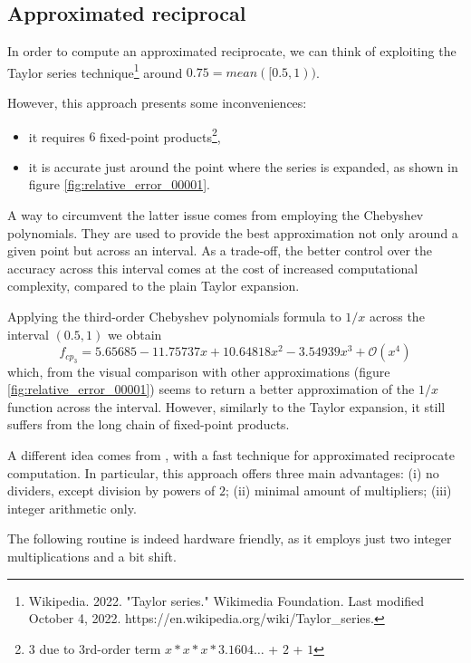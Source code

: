 \subsection{Approximated reciprocal}

In order to compute an approximated reciprocate, we can think of exploiting the Taylor series technique\footnote{Wikipedia. 2022. "Taylor series." Wikimedia Foundation. Last modified October 4, 2022. https://en.wikipedia.org/wiki/Taylor\_series.} around $ 0.75 = mean([0.5, 1))$.


However, this approach presents some inconveniences:
\begin{itemize}
\item it requires $6$ fixed-point products\footnote{$3$ due to 3rd-order term $x*x*x*3.1604\dots$ + $2$ + $1$},
\item it is accurate just around the point where the series is expanded, as shown in figure \ref{fig:relative_error_00001}.
\end{itemize}
A way to circumvent the latter issue comes from employing the Chebyshev polynomials. They are used to provide the best approximation not only around a given point but across an interval.
As a trade-off, the better control over the accuracy across this interval comes at the cost of increased computational complexity, compared to the plain Taylor expansion.


Applying the third-order Chebyshev polynomials \cite{Hale2015}formula to $1/x$ across the interval $(0.5, 1)$ we obtain
\begin{equation}\label{equ:3rd_order_Chebyshev_polynomial_equation}
f_{cp_3} = 5.65685 - 11.75737x + 10.64818x^2 - 3.54939 x^3 + \mathcal{O}(x^4)
\end{equation}
which, from the visual comparison with other approximations (figure \ref{fig:relative_error_00001}) seems to return a better approximation of the $1/x$ function across the interval. However, similarly to the Taylor expansion, it still suffers from the long chain of fixed-point products.

A different idea comes from \cite{drom}, with a fast technique for approximated reciprocate computation. In particular, this approach offers three main advantages: (i) no dividers, except division by powers of $2$; (ii) minimal amount of multipliers; (iii) integer arithmetic only.


The following routine is indeed hardware friendly, as it employs just two integer multiplications and a bit shift.

